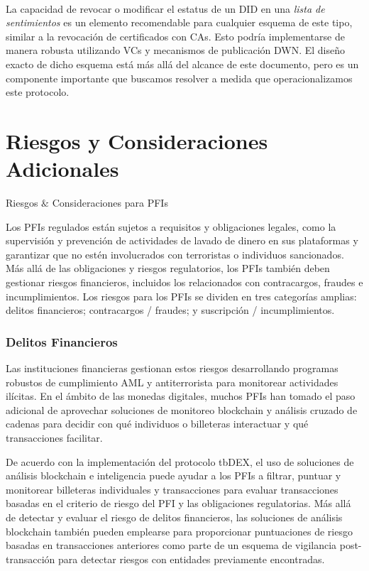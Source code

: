\documentclass[11pt]{article}
\begin{document}
\\ La capacidad de revocar o modificar el estatus de un DID en una \textit{lista de sentimientos} es un elemento recomendable para cualquier esquema de este tipo, similar a la revocación de certificados con CAs. Esto podría implementarse de manera robusta utilizando VCs y mecanismos de publicación DWN. El diseño exacto de dicho esquema está más allá del alcance de este documento, pero es un componente importante que buscamos resolver a medida que operacionalizamos este protocolo.

\vspace{1\baselineskip}
\section{Riesgos y Consideraciones Adicionales}

\vspace{1\baselineskip}
{\LARGE Riesgos $\&$ Consideraciones para PFIs}

\vspace{1\baselineskip}
Los PFIs regulados están sujetos a requisitos y obligaciones legales, como la supervisión y prevención de actividades de lavado de dinero en sus plataformas y garantizar que no estén involucrados con terroristas o individuos sancionados. Más allá de las obligaciones y riesgos regulatorios, los PFIs también deben gestionar riesgos financieros, incluidos los relacionados con contracargos, fraudes e incumplimientos. Los riesgos para los PFIs se dividen en tres categorías amplias: delitos financieros; contracargos / fraudes; y suscripción / incumplimientos.

\subsubsection{Delitos Financieros}

Las instituciones financieras gestionan estos riesgos desarrollando programas robustos de cumplimiento AML y antiterrorista para monitorear actividades ilícitas. En el ámbito de las monedas digitales, muchos PFIs han tomado el paso adicional de aprovechar soluciones de monitoreo blockchain y análisis cruzado de cadenas para decidir con qué individuos o billeteras interactuar y qué transacciones facilitar.

\vspace{1\baselineskip}
De acuerdo con la implementación del protocolo tbDEX, el uso de soluciones de análisis blockchain e inteligencia puede ayudar a los PFIs a filtrar, puntuar y monitorear billeteras individuales y transacciones para evaluar transacciones basadas en el criterio de riesgo del PFI y las obligaciones regulatorias. Más allá de detectar y evaluar el riesgo de delitos financieros, las soluciones de análisis blockchain también pueden emplearse para proporcionar puntuaciones de riesgo basadas en transacciones anteriores como parte de un esquema de vigilancia post-transacción para detectar riesgos con entidades previamente encontradas.
\end{document}
